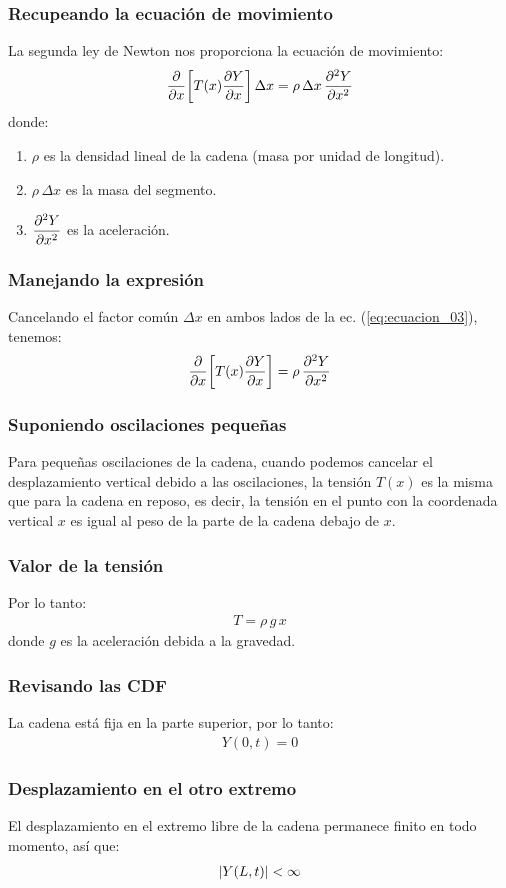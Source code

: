 \documentclass[12pt]{beamer}
\begin{document}
\begin{frame}
\frametitle{Recupeando la ecuación de movimiento}
La segunda ley de Newton nos proporciona la ecuación de movimiento:
\pause
\begin{align}
\pdv{x} \bigg[ T (x) \pdv{Y}{x} \bigg] \, \Delta x = \rho \, \Delta x \, \pdv[2]{Y}{x}
\label{eq:ecuacion_03}
\end{align}
donde:
\pause
{}
\begin{enumerate}[<+->]
\item $\rho$ es la densidad lineal de la cadena (masa por unidad de longitud).
\item $\rho \, \Delta x$  es la masa del segmento.
\item $\displaystyle \pdv[2]{Y}{x}$ es la aceleración.
\end{enumerate}
\end{frame}
\begin{frame}
\frametitle{Manejando la expresión}
Cancelando el factor común $\Delta x$ en ambos lados de la ec. (\ref{eq:ecuacion_03}), tenemos:
\pause
\begin{align}
\pdv{x} \bigg[ T (x) \pdv{Y}{x} \bigg] = \rho \, \pdv[2]{Y}{x}
\label{eq:ecuacion_04}
\end{align}
\end{frame}
\begin{frame}
\frametitle{Suponiendo oscilaciones pequeñas}
Para pequeñas oscilaciones de la cadena, cuando podemos cancelar el desplazamiento vertical debido a las oscilaciones, \pause la tensión $T (x)$ es la misma que para la cadena en reposo, \pause es decir, la tensión en el punto con la coordenada vertical $x$ es igual al peso de la parte de la cadena debajo de $x$.
\end{frame}
\begin{frame}
\frametitle{Valor de la tensión}
Por lo tanto:
\pause
\begin{align}
T = \rho \, g \, x
\label{eq:ecuacion_05}
\end{align}
donde $g$ es la aceleración debida a la gravedad.
\end{frame}
\begin{frame}
\frametitle{Revisando las CDF}
La cadena está fija en la parte superior, por lo tanto:
\pause
\begin{align}
Y (0, t) = 0
\label{eq:ecuacion_06}
\end{align}
\end{frame}
\begin{frame}
\frametitle{Desplazamiento en el otro extremo}
El desplazamiento en el extremo libre de la cadena permanece finito en todo momento, así que:
\pause
\begin{align}
\abs{Y (L, t)} < \infty
\label{eq:ecuacion_07}
\end{align}
\end{frame}
\end{document}
